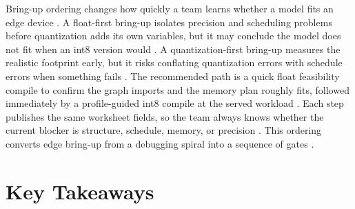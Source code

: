 Bring-up ordering changes how quickly a team learns whether a model fits an edge device \citep{rotem2018glow,patel2025llminference}. A float-first bring-up isolates precision and scheduling problems before quantization adds its own variables, but it may conclude the model does not fit when an int8 version would \citep{memoryfloor2026,taxbreak2026}. A quantization-first bring-up measures the realistic footprint early, but it risks conflating quantization errors with schedule errors when something fails \citep{dao2022flashattention,patel2025llminference}. The recommended path is a quick float feasibility compile to confirm the graph imports and the memory plan roughly fits, followed immediately by a profile-guided int8 compile at the served workload \citep{rotem2018glow,patel2025llminference}. Each step publishes the same worksheet fields, so the team always knows whether the current blocker is structure, schedule, memory, or precision \citep{chen2020compilerbasedhardw,memoryfloor2026}. This ordering converts edge bring-up from a debugging spiral into a sequence of gates \citep{taxbreak2026,rotem2018glow}.

\section{Key Takeaways}
\label{sec:ch19_key_takeaways}

